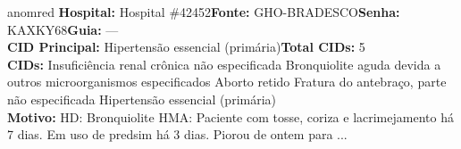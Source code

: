 \documentclass[a4paper,10pt]{article}
\begin{document}
\begin{anomalycard}[Interna\c{c}\~{a}o \#121133 | Pac. \#100384 | CR\'{I}TICO (z=5.80) | LOS: 11d | 12/03/2026\,$\to$\,—]{anomred}
\textbf{Hospital:} Hospital \#42452\quad \textbf{Fonte:} GHO-BRADESCO\quad \textbf{Senha:} KAXKY68\quad \textbf{Guia:} ---\\

\textbf{CID Principal:} {\small Hipertensão essencial (primária)}\quad\textbf{Total CIDs:} 5\\

\textbf{CIDs:} {\scriptsize Insuficiência renal crônica não especificada \textbar{} Bronquiolite aguda devida a outros microorganismos especificados \textbar{} Aborto retido \textbar{} Fratura do antebraço, parte não especificada \textbar{} Hipertensão essencial (primária)}\\

\textbf{Motivo:} {\scriptsize HD: Bronquiolite  HMA: Paciente com tosse, coriza e lacrimejamento há 7 dias. Em uso de predsim há 3 dias. Piorou de ontem para ...}\\




\end{anomalycard}
\end{document}
